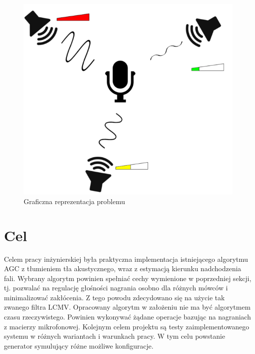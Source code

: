 \begin{figure}[h]
    \centering
    \includegraphics[width=\textwidth]{Images/setup.png}
    \caption{Graficzna reprezentacja problemu}
    \label{fig:setup}
\end{figure}

\section{Cel}
Celem pracy inżynierskiej była praktyczna implementacja istniejącego algorytmu AGC z tłumieniem tła akustycznego, wraz z estymacją kierunku nadchodzenia fali. Wybrany algorytm powinien spełniać cechy wymienione w poprzedniej sekcji, tj. pozwalać na regulację głośności nagrania osobno dla różnych mówców i minimalizować zakłócenia. Z tego powodu zdecydowano się na użycie tak zwanego filtra LCMV. Opracowany algorytm w założeniu nie ma być algorytmem czasu rzeczywistego. Powinien wykonywać żądane operacje bazując na nagraniach z macierzy mikrofonowej. Kolejnym celem projektu są testy zaimplementowanego systemu w różnych wariantach i warunkach pracy. W tym celu powstanie generator symulujący różne możliwe konfiguracje.

